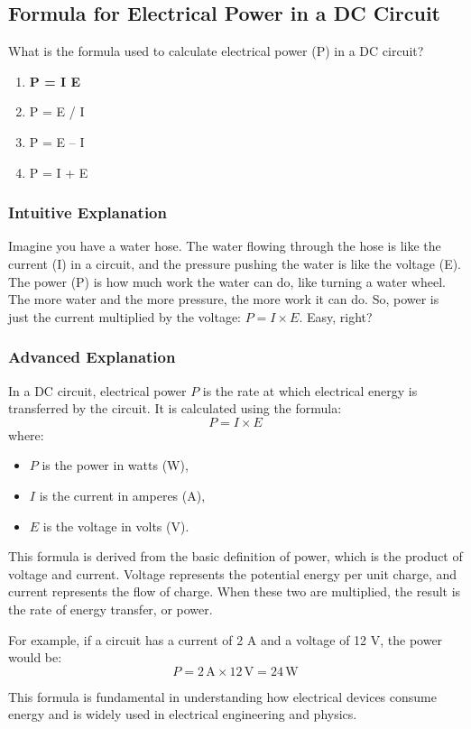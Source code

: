 \subsection{Formula for Electrical Power in a DC Circuit}
\label{T5C08}

\begin{tcolorbox}[colback=gray!10!white,colframe=black!75!black,title=T5C08]
What is the formula used to calculate electrical power (P) in a DC circuit?
\begin{enumerate}[label=\Alph*)]
    \item \textbf{P = I E}
    \item P = E / I
    \item P = E – I
    \item P = I + E
\end{enumerate}
\end{tcolorbox}

\subsubsection{Intuitive Explanation}
Imagine you have a water hose. The water flowing through the hose is like the current (I) in a circuit, and the pressure pushing the water is like the voltage (E). The power (P) is how much work the water can do, like turning a water wheel. The more water and the more pressure, the more work it can do. So, power is just the current multiplied by the voltage: \( P = I \times E \). Easy, right?

\subsubsection{Advanced Explanation}
In a DC circuit, electrical power \( P \) is the rate at which electrical energy is transferred by the circuit. It is calculated using the formula:
\[
P = I \times E
\]
where:
\begin{itemize}
    \item \( P \) is the power in watts (W),
    \item \( I \) is the current in amperes (A),
    \item \( E \) is the voltage in volts (V).
\end{itemize}

This formula is derived from the basic definition of power, which is the product of voltage and current. Voltage represents the potential energy per unit charge, and current represents the flow of charge. When these two are multiplied, the result is the rate of energy transfer, or power.

For example, if a circuit has a current of 2 A and a voltage of 12 V, the power would be:
\[
P = 2 \, \text{A} \times 12 \, \text{V} = 24 \, \text{W}
\]

This formula is fundamental in understanding how electrical devices consume energy and is widely used in electrical engineering and physics.

